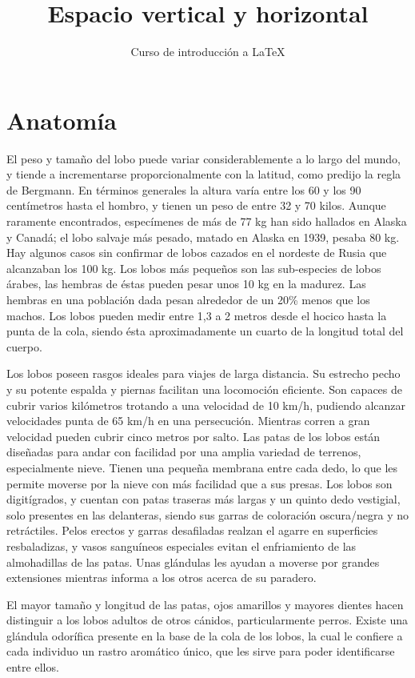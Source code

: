 \documentclass[10pt,letterpaper]{article}
\title{Espacio vertical y horizontal}
\author{Curso de introducción a LaTeX}
\begin{document}
\maketitle
\section{Anatomía}
\vspace{-0.5cm}

El peso y tamaño del lobo puede variar considerablemente a lo largo del mundo, y tiende a incrementarse proporcionalmente con la latitud, como predijo la regla de Bergmann. En términos generales la altura varía entre los 60 y los 90 centímetros hasta el hombro, y tienen un peso de entre 32 y 70 kilos. Aunque raramente encontrados, especímenes de más de 77 kg han sido hallados en Alaska y Canadá; el lobo salvaje más pesado, matado en Alaska en 1939, pesaba 80 kg. Hay algunos casos sin confirmar de lobos cazados en el nordeste de Rusia que alcanzaban los 100 kg. Los lobos más pequeños son las sub-especies de lobos árabes, las hembras de éstas pueden pesar unos 10 kg en la madurez. Las hembras en una población dada pesan alrededor de un 20\% menos que los machos. Los lobos pueden medir entre 1,3 a 2 metros desde el hocico hasta la punta de la cola, siendo ésta aproximadamente un cuarto de la longitud total del cuerpo.
\vspace{2cm}

Los lobos poseen rasgos ideales para viajes de larga distancia. Su estrecho pecho y su potente espalda y piernas facilitan una locomoción eficiente. Son capaces de cubrir varios kilómetros trotando a una velocidad de 10 km/h, pudiendo alcanzar velocidades punta de 65 km/h en una persecución. Mientras corren a gran velocidad pueden cubrir cinco metros por salto. Las patas de los lobos están diseñadas para andar con facilidad por una amplia variedad de terrenos, especialmente nieve. Tienen una pequeña membrana entre cada dedo, lo que les permite moverse por la nieve con más facilidad que a sus presas. Los lobos son digitígrados, y cuentan con patas traseras más largas y un quinto dedo vestigial, solo presentes en las delanteras, siendo sus garras de coloración oscura/negra y no retráctiles. Pelos erectos y garras desafiladas realzan el agarre en superficies resbaladizas, y vasos sanguíneos especiales evitan el enfriamiento de las almohadillas de las patas. Unas glándulas les ayudan a moverse por grandes extensiones mientras informa a los otros acerca de su paradero.
 
\noindent El mayor tamaño y longitud de las patas, ojos amarillos y mayores dientes hacen distinguir a los lobos adultos de otros cánidos, particularmente perros. Existe una glándula odorífica presente en la base de la cola de los lobos, la cual le confiere a cada individuo un rastro aromático único, que les sirve para poder identificarse entre ellos.
 
\end{document}
